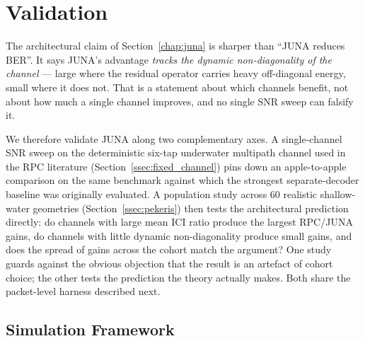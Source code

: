 \documentclass{wileysev}
\begin{document}
%
%	
		\section{Validation}
	\label{chap:results}

	The architectural claim of Section~\ref{chap:juna} is sharper than ``JUNA reduces BER''. It says JUNA's advantage \emph{tracks the dynamic non-diagonality of the channel} --- large where the residual operator carries heavy off-diagonal energy, small where it does not. That is a statement about which channels benefit, not about how much a single channel improves, and no single SNR sweep can falsify it.

	We therefore validate JUNA along two complementary axes. A single-channel SNR sweep on the deterministic six-tap underwater multipath channel used in the RPC literature (Section~\ref{ssec:fixed_channel}) pins down an apple-to-apple comparison on the same benchmark against which the strongest separate-decoder baseline was originally evaluated. A population study across 60 realistic shallow-water geometries (Section~\ref{ssec:pekeris}) then tests the architectural prediction directly: do channels with large mean ICI ratio produce the largest RPC/JUNA gains, do channels with little dynamic non-diagonality produce small gains, and does the spread of gains across the cohort match the argument? One study guards against the obvious objection that the result is an artefact of cohort choice; the other tests the prediction the theory actually makes. Both share the packet-level harness described next.

	\subsection{Simulation Framework}
	\label{ssec:simframework}
\end{document}
